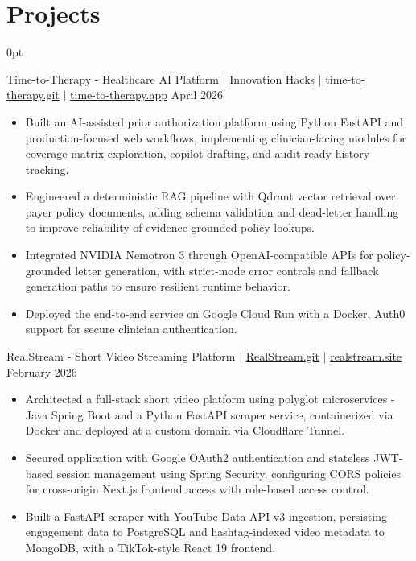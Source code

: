 \documentclass[letterpaper,10pt]{article}
\newlength{\contentindent}
\newcommand{\sectioncontent}[1]{%
  \begin{adjustwidth}{\contentindent}{0pt}%
  #1%
  \end{adjustwidth}%
}
\begin{document}
\section{Projects}
\sectioncontent{

Time-to-Therapy - Healthcare AI Platform $|$ \href{https://www.innovationhacks.dev/}{Innovation Hacks} $|$ \href{https://github.com/Saurav-Kalaskar/time-to-therapy}{time-to-therapy.git} $|$ \href{https://time-to-therapy-4todzcphia-uc.a.run.app/}{time-to-therapy.app} \hfill April 2026
\begin{itemize}
    \item Built an AI-assisted prior authorization platform using Python FastAPI and production-focused web workflows, implementing clinician-facing modules for coverage matrix exploration, copilot drafting, and audit-ready history tracking.
    \item Engineered a deterministic RAG pipeline with Qdrant vector retrieval over payer policy documents, adding schema validation and dead-letter handling to improve reliability of evidence-grounded policy lookups.
    \item Integrated NVIDIA Nemotron 3 through OpenAI-compatible APIs for policy-grounded letter generation, with strict-mode error controls and fallback generation paths to ensure resilient runtime behavior.
    \item Deployed the end-to-end service on Google Cloud Run with a Docker, Auth0 support for secure clinician authentication.
\end{itemize}

RealStream - Short Video Streaming Platform $|$ \href{https://github.com/Saurav-Kalaskar/RealStream.git}{RealStream.git} $|$ \href{https://realstream.site/}{realstream.site} \hfill February 2026
\begin{itemize}
    \item Architected a full-stack short video platform using polyglot microservices - Java Spring Boot and a Python FastAPI scraper service, containerized via Docker and deployed at a custom domain via Cloudflare Tunnel.
    \item Secured application with Google OAuth2 authentication and stateless JWT-based session management using Spring Security, configuring CORS policies for cross-origin Next.js frontend access with role-based access control.
    \item Built a FastAPI scraper with YouTube Data API v3 ingestion, persisting engagement data to PostgreSQL and hashtag-indexed video metadata to MongoDB, with a TikTok-style React 19 frontend.
\end{itemize}

}
\end{document}
